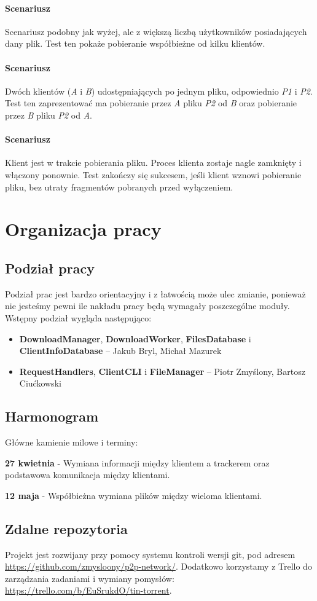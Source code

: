\documentclass[11pt]{article}
\begin{document}
\paragraph{Scenariusz } Scenariusz podobny jak wyżej, ale z większą liczbą użytkowników posiadających dany plik. Test ten pokaże pobieranie współbieżne od kilku klientów.
\paragraph{Scenariusz } Dwóch klientów (\textsl{A} i \textsl{B}) udostępniających po jednym pliku, odpowiednio \textsl{P1} i \textsl{P2}. Test ten zaprezentować ma pobieranie przez \textsl{A} pliku \textsl{P2} od \textsl{B} oraz pobieranie przez \textsl{B} pliku \textsl{P2} od \textsl{A}.
\paragraph{Scenariusz } Klient jest w trakcie pobierania pliku. Proces klienta zostaje nagle zamknięty i włączony ponownie. Test zakończy się sukcesem, jeśli klient wznowi pobieranie pliku, bez utraty fragmentów pobranych przed wyłączeniem.

\clearpage
\section{Organizacja pracy}
\subsection{Podział pracy}
Podział prac jest bardzo orientacyjny i z łatwością może ulec zmianie, ponieważ nie jesteśmy pewni ile nakładu pracy będą wymagały poszczególne moduły. Wstępny podział wygląda następująco:
\begin{itemize}
\item \textbf{DownloadManager}, \textbf{DownloadWorker}, \textbf{FilesDatabase} i \textbf{ClientInfoDatabase} -- Jakub Bryl, Michał Mazurek
\item \textbf{RequestHandlers}, \textbf{ClientCLI} i \textbf{FileManager} -- Piotr Zmyślony, Bartosz Ciućkowski 
\end{itemize}
\subsection{Harmonogram}
Główne kamienie milowe i terminy:

\textbf{27 kwietnia} - Wymiana informacji między klientem a trackerem oraz podstawowa komunikacja między klientami. 

\textbf{12 maja} - Współbieżna wymiana plików między wieloma klientami. 

\subsection{Zdalne repozytoria}
Projekt jest rozwijany przy pomocy systemu kontroli wersji git, pod adresem \url{https://github.com/zmysloony/p2p-network/}. Dodatkowo korzystamy z Trello do zarządzania zadaniami i wymiany pomysłów: \url{https://trello.com/b/EuSrukdO/tin-torrent}.
\end{document}
